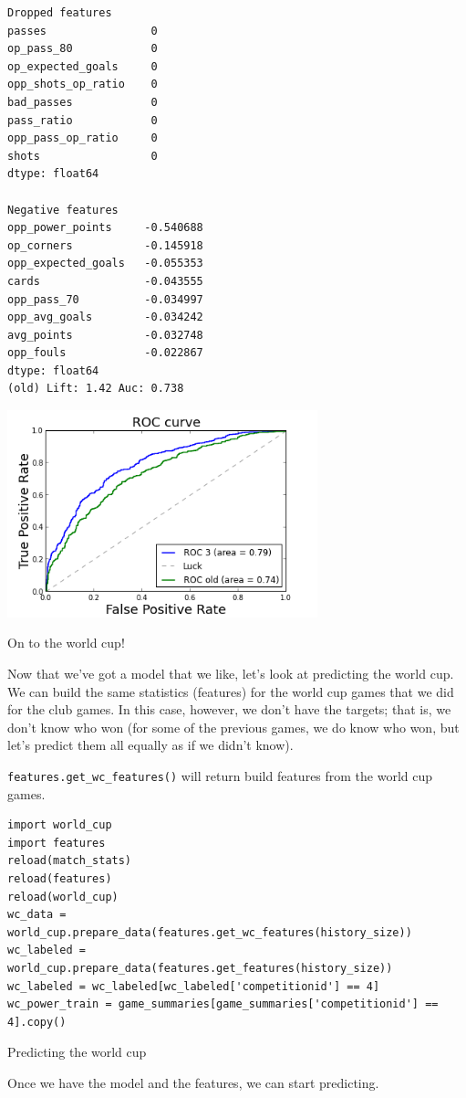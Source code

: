 \documentclass[12pt,fleqn]{article}\usepackage{../common}
\begin{document}
\begin{verbatim}
Dropped features
passes                0
op_pass_80            0
op_expected_goals     0
opp_shots_op_ratio    0
bad_passes            0
pass_ratio            0
opp_pass_op_ratio     0
shots                 0
dtype: float64

Negative features
opp_power_points     -0.540688
op_corners           -0.145918
opp_expected_goals   -0.055353
cards                -0.043555
opp_pass_70          -0.034997
opp_avg_goals        -0.034242
avg_points           -0.032748
opp_fouls            -0.022867
dtype: float64
(old) Lift: 1.42 Auc: 0.738
\end{verbatim}

\includegraphics[height=6cm]{doc_en_02.png}


On to the world cup!

Now that we've got a model that we like, let's look at predicting the world
cup. We can build the same statistics (features) for the world cup games
that we did for the club games. In this case, however, we don't have the
targets; that is, we don't know who won (for some of the previous games, we
do know who won, but let's predict them all equally as if we didn't know).

\verb!features.get_wc_features()! will return build features from the world
cup games.

\begin{verbatim}
import world_cup
import features
reload(match_stats)
reload(features)
reload(world_cup)
wc_data = world_cup.prepare_data(features.get_wc_features(history_size))
wc_labeled = world_cup.prepare_data(features.get_features(history_size))
wc_labeled = wc_labeled[wc_labeled['competitionid'] == 4]
wc_power_train = game_summaries[game_summaries['competitionid'] == 4].copy()
\end{verbatim}

Predicting the world cup

Once we have the model and the features, we can start predicting.
\end{document}

